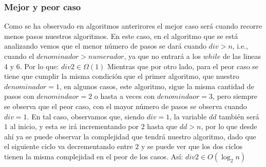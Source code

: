 \documentclass[12pt,twoside]{article}
\begin{document}
\subsubsection{Mejor y peor caso}
Como se ha observado en algoritmos anterirores el mejor caso será cuando recorre menos pasos nuestros algoritmos. En este caso, en el algoritmo que se está analizando vemos que el menor número de pasos se dará cuando $div > n$, i.e., cuando el $denominador > numerador$, ya que no entrará a los $while$ de las lineas 4 y 6. Por lo que:\newline\newline
$div2 \in \Omega(1)$\newline\newline
Mientras que por otro lado, para el peor caso se tiene que cumplir la misma condición que el primer algoritmo, que nuestro $denominador = 1$, en algunos casos, este algoritmo, sigue la misma cantidad de pasos con $denomindaor = 2$ o hasta a veces con $denomindaor = 3$, pero siempre se observa que el peor caso, con el mayor número de pasos se observa cuando $div = 1$. En tal caso, observamos que, siendo $div = 1$, la variable $dd$ también será $1$ al inicio, y esta se irá incrementando por $2$ hasta que $dd > n$, por lo que desde ahí ya se puede observar la complejidad que tendrá nuestro algoritmo, dado que el siguiente ciclo va decrementando entre $2$ y se puede ver que los dos ciclos tienen la misma complejidad en el peor de los casos. Así:\newline\newline
$div2 \in O(\log_2n)$
\end{document}
